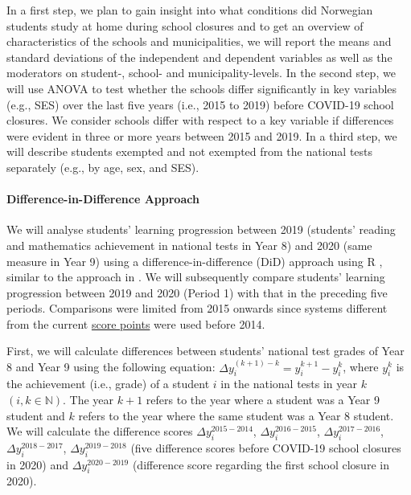 In a first step, we plan to gain insight into what conditions did Norwegian students study at home during school closures and to get an overview of characteristics of the schools and municipalities, we will report the means and standard deviations of the independent and dependent variables as well as the moderators on student-, school- and municipality-levels. In the second step, we will use ANOVA to test whether the schools differ significantly in key variables (e.g., SES) over the last five years (i.e., 2015 to 2019) before COVID-19 school closures. We consider schools differ with respect to a key variable if differences were evident in three or more years between 2015 and 2019. In a third step, we will describe students exempted and not exempted from the national tests separately (e.g., by age, sex, and SES).

\paragraph{Difference-in-Difference Approach}

We will analyse students' learning progression between 2019 (students' reading and mathematics achievement in national tests in Year 8) and 2020 (same measure in Year 9) using a difference-in-difference (DiD) approach \parencite{angrist:2009} using \textsf{R} \parencite[e.g., ][]{brumback:2021}, similar to the approach in \textcite{engzell:2021}. We will subsequently compare students' learning progression between 2019 and 2020 (Period 1) with that in the preceding five periods. Comparisons were limited from 2015 onwards since systems different from the current \href{https://www.ssb.no/en/utdanning/grunnskoler/statistikk/nasjonale-prover}{score points} were used before 2014.

First, we will calculate differences between students' national test grades of Year 8 and Year 9 using the following equation: $\Delta y_i^{(k+1)-k} = y_i^{k+1} - y_i^k$, where $y_i^k$  is the achievement (i.e., grade) of a student $i$ in the national tests in year $k$ $(i, k \in \mathbb{N})$. The year $k+1$ refers to the year where a student was a Year 9 student and $k$ refers to the year where the same student was a Year 8 student. We will calculate the difference scores $\Delta y_i^{2015-2014}$,  $\Delta y_i^{2016-2015}$, $\Delta y_i^{2017-2016}$, $\Delta y_i^{2018-2017}$, $\Delta y_i^{2019-2018}$ (five difference scores before COVID-19 school closures in 2020) and $\Delta y_i^{2020-2019}$ (difference score regarding the first school closure in 2020).

